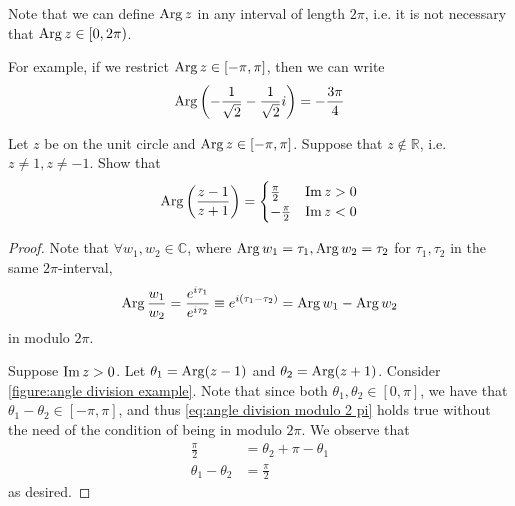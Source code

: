 \documentclass[11pt, oneside]{book}
\begin{document}
\begin{ex}
	Note that we can define $\operatorname{Arg} z$ in any interval of length $2 \pi$, i.e. it is not necessary that $\operatorname{Arg} z \in [0, 2\pi)$.

	For example, if we restrict $\operatorname{Arg} z \in [-\pi, \pi]$, then we can write
	\begin{equation*}
		\operatorname{Arg} \left(-\frac{1}{\sqrt{2}} - \frac{1}{\sqrt{2}} i \right) = - \frac{3\pi}{4}
	\end{equation*}

	Let $z$ be on the unit circle and $\operatorname{Arg} z \in [-\pi, \pi]$. Suppose that $z \notin \mathbb{R}$, i.e. $z \neq 1, z \neq -1$. Show that
	\begin{equation*}
		\operatorname{Arg} \left( \frac{z-1}{z+1} \right) = \begin{cases}
			\frac{\pi}{2} & \operatorname{Im}{z} > 0 \\
			-\frac{\pi}{2} & \operatorname{Im}{z} < 0
		\end{cases}
	\end{equation*}

	\begin{proof}
		Note that $\forall w_1, w_2 \in \mathbb{C}$, where $\operatorname{Arg} w_1 = \tau_1, \operatorname{Arg} w_2 = \tau_2$ for $\tau_1, \tau_2$ in the same $2\pi$-interval,
		\begin{equation}\label{eq:angle division modulo 2 pi}
			\operatorname{Arg} \frac{w_1}{w_2} = \frac{e^{i\tau_1}}{e^{i\tau_2}} \equiv e^{i (\tau_1 - \tau_2)} = \operatorname{Arg} w_1 - \operatorname{Arg} w_2
		\end{equation}
		in modulo $2\pi$.

		Suppose $\operatorname{Im}{z} > 0$. Let $\theta_1 = \operatorname{Arg} (z - 1)$ and $\theta_2 = \operatorname{Arg} (z + 1)$. Consider \cref{figure:angle division example}. Note that since both $\theta_1, \theta_2 \in [0, \pi]$, we have that $\theta_1 - \theta_2 \in [-\pi, \pi]$, and thus \cref{eq:angle division modulo 2 pi} holds true without the need of the condition of being in modulo $2 \pi$. We observe that
		\begin{align*}
			\frac{\pi}{2} &= \theta_2 + \pi - \theta_1 \\
			\theta_1 - \theta_2 &= \frac{\pi}{2}
		\end{align*}
		as desired.


\end{proof}
\end{ex}
\end{document}
